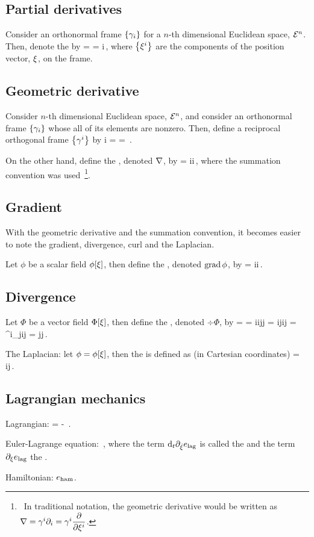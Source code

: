 \subsection{Partial derivatives}
Consider an orthonormal frame $\left\lbrace{\gamma_{i}}\right\rbrace$ for a $n$-th dimensional Euclidean space, $\mathcal{\mathcal{E}}^{n}$. Then, denote the  by
\beq
{} =  
                    = \igd i\,,
\eeq
where $\left\lbrace{{\xi}^{i}}\right\rbrace$ are the components of the position vector, $\xi$, on the frame.


\subsection{Geometric derivative}
Consider $n$-th dimensional Euclidean space, $\mathcal{\mathcal{E}}^{n}$, and consider an orthonormal frame $\left\lbrace{\gamma_{i}}\right\rbrace$ whose all of its elements are nonzero. Then, define a reciprocal orthogonal frame $\left\lbrace{\gamma^{i}}\right\rbrace$ by
\beq
\rbvec i =  = \,.
\eeq

On the other hand, define the , denoted $\nabla$, by
\beq
\gder = \rbvec i\igd i\,,
\eeq
where the summation convention was used~\footnote{~In traditional notation, the geometric derivative would be written as $\nabla = \gamma^{i}\partial_{i} = \gamma^{i}\dfrac{\partial{}}{\partial{{\xi}^{i}}}$.}.


\subsection{Gradient}
With the geometric derivative and the summation convention, it becomes easier to note the gradient, divergence, curl and the Laplacian.

Let $\phi$ be a scalar field $\phi\!\left[{\xi}\right]$, then define the , denoted $\operatorname{grad}\phi$, by
\beq
\grad\phi = \rbvec i\igd i\phi\,.
\eeq


\subsection{Divergence}
Let $\Phi$ be a vector field $\Phi\!\left[{\xi}\right]$, then define the , denoted $\div\Phi$, by
\beq
\div\Phi = \gder\iprod\Phi 
         = \rbvec i\igd i\iprod\fbvec j\fvec\Phi j
         = \rbvec i\iprod\fbvec j\igd i\fvec\Phi j
         = \metric^i_j\igd i\fvec\Phi j
         = \igd j\fvec\Phi j\,.         
\eeq

The Laplacian: let $\phi = \phi\!\left[{\xi}\right]$, then the  is defined as (in Cartesian coordinates)
\beq
\lap\phi = \igd i\igd j\phi\,.
\eeq


\subsection{Lagrangian mechanics}
Lagrangian:
\beq
\lag = \ken - \pen\,.
\eeq

Euler-Lagrange equation:
\beq
\eleq{\pos}{\dt\pos}\,,
\eeq
where the term $\text{d}_{t}\partial_{\dot{\xi}}e_\text{lag}$ is called the  and the term $\partial_{\xi}e_\text{lag}$ the .

Hamiltonian: $e_\text{ham}$.
